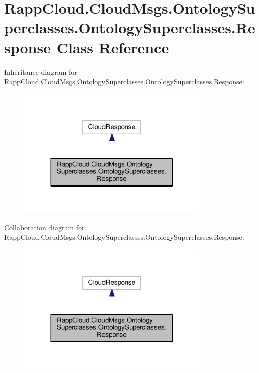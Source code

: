 \hypertarget{classRappCloud_1_1CloudMsgs_1_1OntologySuperclasses_1_1OntologySuperclasses_1_1Response}{\section{Rapp\-Cloud.\-Cloud\-Msgs.\-Ontology\-Superclasses.\-Ontology\-Superclasses.\-Response Class Reference}
\label{classRappCloud_1_1CloudMsgs_1_1OntologySuperclasses_1_1OntologySuperclasses_1_1Response}
}


Inheritance diagram for Rapp\-Cloud.\-Cloud\-Msgs.\-Ontology\-Superclasses.\-Ontology\-Superclasses.\-Response\-:
\nopagebreak
\begin{figure}[H]
\begin{center}
\leavevmode
\includegraphics[width=260pt]{classRappCloud_1_1CloudMsgs_1_1OntologySuperclasses_1_1OntologySuperclasses_1_1Response__inherit__graph}
\end{center}
\end{figure}


Collaboration diagram for Rapp\-Cloud.\-Cloud\-Msgs.\-Ontology\-Superclasses.\-Ontology\-Superclasses.\-Response\-:
\nopagebreak
\begin{figure}[H]
\begin{center}
\leavevmode
\includegraphics[width=260pt]{classRappCloud_1_1CloudMsgs_1_1OntologySuperclasses_1_1OntologySuperclasses_1_1Response__coll__graph}
\end{center}
\end{figure}
